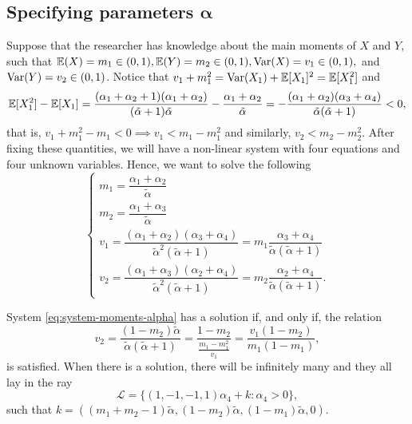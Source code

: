 \subsection{Specifying parameters
\texorpdfstring{$\boldsymbol{\alpha}$}{alpha}}

Suppose that the researcher has knowledge about the main moments of $X$ and
$Y$, such that $\mathbb{E}(X) = m_1 \in (0,1), \mathbb{E}(Y) = m_2 \in (0,1), \operatorname{Var}(X) = v_1
\in (0, 1),$ and $\operatorname{Var}(Y) =
v_2 \in (0,1)$. Notice that $v_1 + m_1^2 = \operatorname{Var}(X_1) + \mathbb{E}[X_1]^2 = \mathbb{E}[X_1^2]$ and
$$
\mathbb{E}[X_1^2] - \mathbb{E}[X_1] = \frac{(\alpha_1 + \alpha_2 + 1)(\alpha_1 + \alpha_2)}{(\tilde{\alpha} + 1)\tilde{\alpha}} - \frac{\alpha_1 + \alpha_2}{\tilde{\alpha}} = -\frac{(\alpha_1 + \alpha_2)(\alpha_3 + \alpha_4)}{\tilde{\alpha}(\tilde{\alpha}+1)} < 0, 
$$
that is, $v_1 + m_1^2 - m_1 < 0 \implies v_1 < m_1 - m_1^2$ and similarly,
$v_2 < m_2 - m_2^2$. After fixing these quantities, we will have a non-linear system with four equations and four
unknown variables. Hence, we want to solve the following 
\begin{equation}
  \label{eq:system-moments-alpha}
  \begin{cases}
    m_1 = \dfrac{\alpha_1+\alpha_2}{\tilde{\alpha}} \\
    m_2 = \dfrac{\alpha_1+\alpha_3}{\tilde{\alpha}} \\ 
    v_1 = \dfrac{(\alpha_1+\alpha_2)(\alpha_3+\alpha_4)}{\tilde{\alpha}^2(\tilde{\alpha}+1)} = m_1\dfrac{\alpha_3+\alpha_4}{\tilde{\alpha}(\tilde{\alpha}+1)} \\
    v_2 = \dfrac{(\alpha_1+\alpha_3)(\alpha_2+\alpha_4)}{\tilde{\alpha}^2(\tilde{\alpha}+1)} = m_2\dfrac{\alpha_2+\alpha_4}{\tilde{\alpha}(\tilde{\alpha}+1)}.
  \end{cases}
\end{equation}

\begin{proposition}
  System \eqref{eq:system-moments-alpha} has a solution if, and only if, the relation
  \begin{equation}
    \label{eq:v2}
    v_2 = \frac{(1 - m_2)\tilde{\alpha}}{\tilde{\alpha}(\tilde{\alpha}+ 1)} = \frac{1 - m_2}{\frac{m_1 - m_1^2}{v_1}} = \frac{v_1(1 - m_2)}{m_1(1-m_1)},
  \end{equation}
  is satisfied. When there is a solution, there will be
  infinitely many and they all lay in the ray 
  $$
\mathcal{L} = \{(1,-1,-1,1)\alpha_4 + k : \alpha_4 > 0\}, 
$$
such that $k = \left((m_1 + m_2 - 1)\tilde{\alpha}, (1-m_2)\tilde{\alpha},
(1-m_1)\tilde{\alpha}, 0\right)$. 
\end{proposition}

